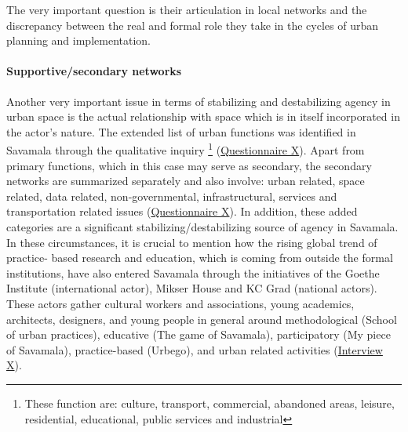 \documentclass[11pt]{report}
\begin{document}
The very important question is their articulation in local networks and the discrepancy between the real and formal role they take in the cycles of urban planning and implementation.

\paragraph{Supportive/secondary networks}

Another very important issue in terms of stabilizing and destabilizing agency in urban space is the actual relationship with space which is in itself incorporated in the actor's nature.
The extended list of urban functions was identified in Savamala through the qualitative inquiry
\footnote{These function are: culture, transport, commercial, abandoned areas, leisure, residential, educational, public services and industrial}
(\href{Questionnaire Students Savamala}{Questionnaire X}).
Apart from primary functions, which in this case may serve as secondary,  the secondary networks are summarized separately and also involve: urban related, space related, data related, non-governmental, infrastructural, services and transportation related issues (\href{Questionnaire Students Savamala}{Questionnaire X}).
In addition, these added categories are a significant stabilizing/destabilizing  source  of  agency  in  Savamala.
\\

In these circumstances, it is crucial to mention how the rising global trend of practice- based research and education, which is coming from outside the formal institutions, have also entered Savamala through the initiatives of the Goethe Institute (international actor), Mikser House and KC Grad (national actors). These actors gather cultural workers and associations, young academics, architects, designers, and young people in general around methodological (School of urban practices), educative (The game of Savamala), participatory (My piece of Savamala), practice-based (Urbego), and urban related activities (\href{InterviewX}{Interview X}).
\\
\end{document}

